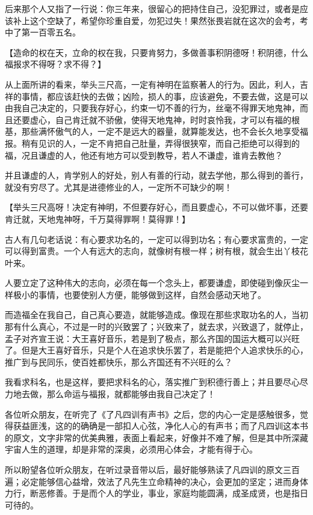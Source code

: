 \documentclass[12pt,twoside,openany]{book}
\newcommand{\kai}[1]{{\CJKfamily{kai}#1}}
\begin{document}
后来那个人又指了一行说：你三年来，很留心的把持住自己，没犯罪过，或者是应该补上这个空缺了，希望你珍重自爱，勿犯过失！果然张畏岩就在这次的会考，考中了第一百零五名。

【\kai{造命的权在天，立命的权在我，只要肯努力，多做善事积阴德呀！积阴德，什么福报求不得呀？求不得？}】

从上面所讲的看来，举头三尺高，一定有神明在监察著人的行为。因此，利人，吉祥的事情，都应该赶快的去做；凶险，损人的事，应该避免，不要去做，这是可以由我自己决定的，只要我存好心，约束一切不善的行为，丝毫不得罪天地鬼神，而且还要虚心，自己肯迁就不骄傲，使得天地鬼神，时时哀怜我，才可以有福的根基，那些满怀傲气的人，一定不是远大的器量，就算能发达，也不会长久地享受福报。稍有见识的人，一定不肯把自己肚量，弄得很狭窄，而自己拒绝可以得到的福，况且谦虚的人，他还有地方可以受到教导，若人不谦虚，谁肯去教他？

并且谦虚的人，肯学别人的好处，别人有善的行动，就去学他，那么得到的善行，就没有穷尽了。尤其是进德修业的人，一定所不可缺少的啊！

【\kai{举头三尺高呀！决定有神明，不但要存好心，而且要虚心，不可以做坏事，还要肯迁就，天地鬼神呀，千万莫得罪啊！莫得罪！}】

古人有几句老话说：有心要求功名的，一定可以得到功名；有心要求富贵的，一定可以得到富贵。一个人有远大的志向，就像树有根一样；树有根，就会生出丫枝花叶来。

人要立定了这种伟大的志向，必须在每一个念头上，都要谦虚，即使碰到像灰尘一样极小的事情，也要使别人方便，能够做到这样，自然会感动天地了。

而造福全在我自己，自己真心要造，就能够造成。像现在那些求取功名的人，当初那有什么真心，不过是一时的兴致罢了；兴致来了，就去求，兴致退了，就停止，孟子对齐宣王说：大王喜好音乐，若是到了极点，那么齐国的国运大概可以兴旺了。但是大王喜好音乐，只是个人在追求快乐罢了，若是能把个人追求快乐的心，推广到与民同乐，使百姓都快乐，那么齐国还有不兴旺的么？

我看求科名，也是这样，要把求科名的心，落实推广到积德行善上；并且要尽心尽力地去做，那么命运与福报，就都能够由我自己决定了！

各位听众朋友，在听完了《了凡四训有声书》之后，您的内心一定是感触很多，觉得获益匪浅，这的的确确是一部扣人心弦，净化人心的有声书；而了凡四训这本书的原文，文字非常的优美典雅，表面上看起来，好像并不难了解，但是其中所深藏宇宙人生的道理，却是非常的深奥，必须用心体会，才能有得于心。

所以盼望各位听众朋友，在听过录音带以后，最好能够熟读了凡四训的原文三百遍；必定能够信心益增，效法了凡先生立命精神的决心，会更加的坚定；进而身体力行，断恶修善。于是而个人的学业，事业，家庭均能圆满，成圣成贤，也是指日可待的。
\end{document}
